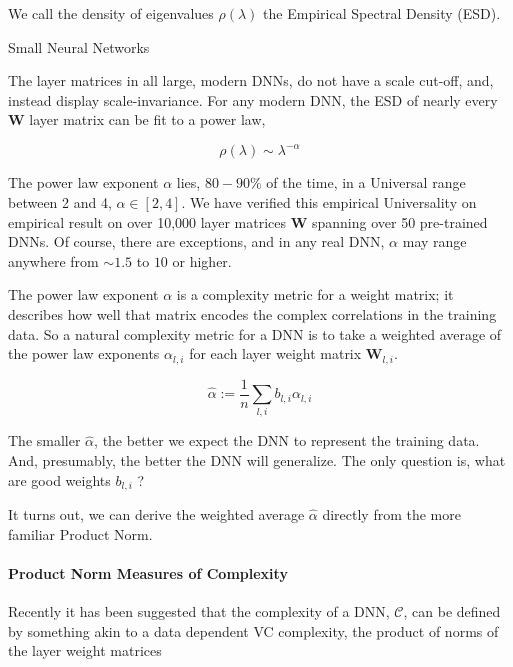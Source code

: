 We call the density of eigenvalues $\rho(\lambda)$ the Empirical Spectral Density (ESD).  

Small Neural Networks 

The layer matrices in all large, modern DNNs, do not have a scale cut-off, and, instead display scale-invariance.  
For any modern DNN, the ESD of nearly every \ $\mathbf{W}$ layer matrix can be fit to a power law,

$$\rho(\lambda)\sim\lambda^{-\alpha}$$

The power law exponent $\alpha$ lies, $80-90\%$ of the time, in a Universal range between 2 and 4, $\alpha\in[2,4]$.
We have verified this empirical Universality on empirical result on over 10,000 layer matrices $\mathbf{W}$ spanning over 50 pre-trained DNNs.
Of course, there are exceptions, and in any real DNN,  $\alpha$ may range anywhere from $\sim1.5$ to $10$ or higher.  

The power law exponent $\alpha$ is a complexity metric for a weight matrix; it describes how well that matrix encodes the complex correlations in the training data.
So a natural complexity metric for a DNN is to take a weighted average of the power law exponents $\alpha_{l,i}$ for each layer weight matrix $\mathbf{W}_{l,i}$.

$$\hat{\alpha}:=\dfrac{1}{n}\sum_{l,i}b_{l,i}\alpha_{l,i}$$

The smaller $\hat{\alpha}$, the better we expect the DNN to represent the training data. And, presumably, the better the DNN will generalize.
The only question is, what are good weights $b_{l,i}$ ?

It turns out, we can derive the weighted average $\hat{\alpha}$ directly from the more familiar Product Norm.


\paragraph{Product Norm Measures of Complexity}

Recently it has been suggested that the complexity of a DNN, $\mathcal{C}$,  can be defined by something akin to a data dependent VC complexity, the product of norms of the layer weight matrices

